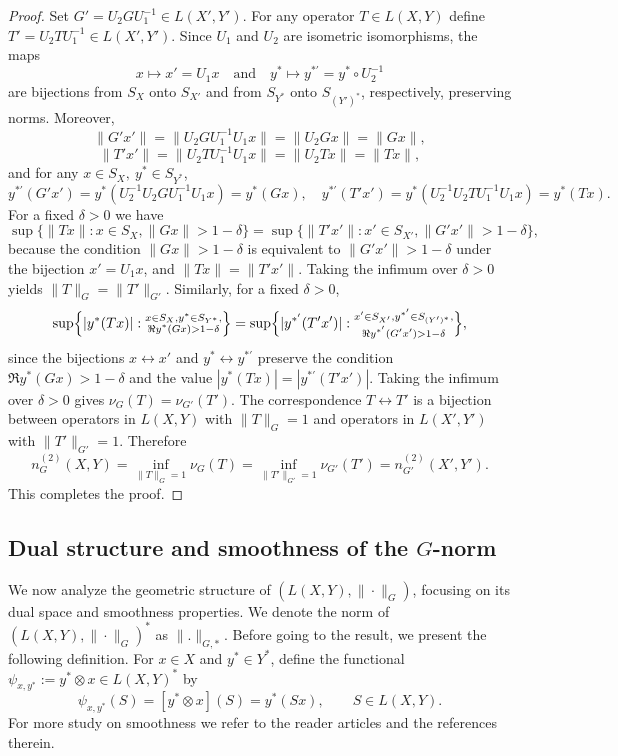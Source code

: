 \documentclass[12pt]{amsart}
\theoremstyle{definition}
\numberwithin{equation}{section}
\newcommand{\norm}[1]{\|#1\|}
\begin{document}
	\begin{proof}
		Set $G' = U_2GU_1^{-1} \in L(X',Y')$. For any operator $T \in L(X,Y)$ define $T' = U_2TU_1^{-1} \in L(X',Y')$. Since $U_1$ and $U_2$ are isometric isomorphisms, the maps
		\[
		x \mapsto x' = U_1x \quad\text{and}\quad y^* \mapsto y^{*'} = y^* \circ U_2^{-1}
		\]
		are bijections from $S_X$ onto $S_{X'}$ and from $S_{Y^*}$ onto $S_{(Y')^*}$, respectively, preserving norms. Moreover,
		\[
		\norm{G'x'} = \norm{U_2GU_1^{-1}U_1x} = \norm{U_2Gx} = \norm{Gx},
		\]
		\[
		\norm{T'x'} = \norm{U_2TU_1^{-1}U_1x} = \norm{U_2Tx} = \norm{Tx},
		\]
		and for any $x \in S_X,\ y^* \in S_{Y^*}$,
		\[
		y^{*'}(G'x') = y^*(U_2^{-1}U_2GU_1^{-1}U_1x) = y^*(Gx),\quad
		y^{*'}(T'x') = y^*(U_2^{-1}U_2TU_1^{-1}U_1x) = y^*(Tx).
		\]
		For a fixed $\delta > 0$ we have
		\[
		\sup\{\norm{Tx}: x\in S_X, \norm{Gx}>1-\delta\}= \sup\{\norm{T'x'}: x'\in S_{X'}, \norm{G'x'}>1-\delta\},
		\]
		because the condition $\norm{Gx}>1-\delta$ is equivalent to $\norm{G'x'}>1-\delta$ under the bijection $x' = U_1x$, and $\norm{Tx} = \norm{T'x'}$. Taking the infimum over $\delta>0$ yields $\norm{T}_G = \norm{T'}_{G'}$. Similarly, for a fixed $\delta > 0$,
		\[
		\sup\Bigl\{ |y^*(Tx)| : \substack{x\in S_X, y^*\in S_{Y^*}, \\ \Re y^*(Gx)>1-\delta} \Bigr\} = \sup\Bigl\{ |y^{*'}(T'x')| : \substack{x'\in S_{X'}, y^{*'}\in S_{(Y')^*}, \\ \Re y^{*'}(G'x')>1-\delta} \Bigr\},
		\]
		since the bijections $x \leftrightarrow x'$ and $y^* \leftrightarrow y^{*'}$ preserve the condition $\Re y^*(Gx)>1-\delta$ and the value $|y^*(Tx)| = |y^{*'}(T'x')|$. Taking the infimum over $\delta>0$ gives $\nu_G(T) = \nu_{G'}(T')$. The correspondence $T \leftrightarrow T'$ is a bijection between operators in $L(X, Y)$ with $\norm{T}_G = 1$ and operators in $L(X', Y')$ with $\norm{T'}_{G'} = 1$. Therefore
		\[
		n_G^{(2)}(X,Y) = \inf_{\norm{T}_G=1} \nu_G(T) = \inf_{\norm{T'}_{G'}=1} \nu_{G'}(T') = n_{G'}^{(2)}(X', Y').
		\]
		This completes the proof.
	\end{proof}
	
	
	
	\subsection{Dual structure and smoothness of the $G$-norm}
	
	We now analyze the geometric structure of $(L(X,Y),\|\cdot\|_G)$, focusing on its dual space and smoothness properties. We denote the norm of $( L(X, Y), \|\cdot\|_G)^*$ as $\|.\|_{G, *}$. Before going to the result, we present the following definition. For $x \in X$ and $y^* \in Y^*$, define the functional $\psi_{x,y^*}:=y^* \otimes x \in L(X,Y)^*$ by
    \[
    \psi_{x,y^*}(S)=[y^* \otimes x](S) = y^*(Sx), \qquad S \in L(X,Y).
    \]
    For more study on smoothness we refer to the reader articles \cite{Kadets1, SR, RoySain, Sain} and the references therein.
\end{document}
